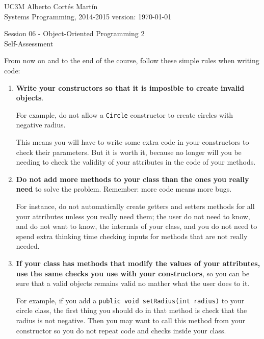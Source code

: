 \documentclass[a4paper, 11pt]{article}
\newcommand{\realtitle}{Session 06 - Object-Oriented Programming 2}
\begin{document}
\makebox[\linewidth]{\rule{\textwidth}{0.4pt}}
UC3M \hfill Alberto Cortés Martín\\
Systems Programming, 2014-2015 \hfill version: \today\\
\makebox[\linewidth]{\rule{\textwidth}{0.4pt}}
\begin{center}
  \Large{\realtitle}\\Self-Assessment
\end{center}
\makebox[\linewidth]{\rule{\textwidth}{0.4pt}}
\vspace{1cm}

From now on and to the end of the course, follow these simple rules when
writing code:

\begin{enumerate}

  \item \textbf{Write your constructors so that it is imposible to create
    invalid objects}.

    For example, do not allow a \verb+Circle+ constructor to
    create circles with negative radius.

    This means you will have to write some extra code in your constructors to
    check their parameters. But it is worth it, because no longer will you be
    needing to check the validity of your attributes in the code of your
    methods.

  \item \textbf{Do not add more methods to your class than the ones you really
    need} to solve the problem. Remember: more code means more bugs.

    For instance, do not automatically create getters and setters methods for
    all your attributes unless you really need them; the user do not need to
    know, and do not want to know, the internals of your class, and you do not
    need to spend extra thinking time checking inputs for methods that are not
    really needed.

  \item \textbf{If your class has methods that modify the values of your
    attributes, use the same checks you use with your constructors}, so you can
    be sure that a valid objects remains valid no mather what the user does to
    it.

    For example, if you add a \verb+public void setRadius(int radius)+ to your
    circle class, the first thing you should do in that method is check that
    the radius is not negative. Then you may want to call this method from your
    constructor so you do not repeat code and checks inside your class.


\end{enumerate}
\end{document}

